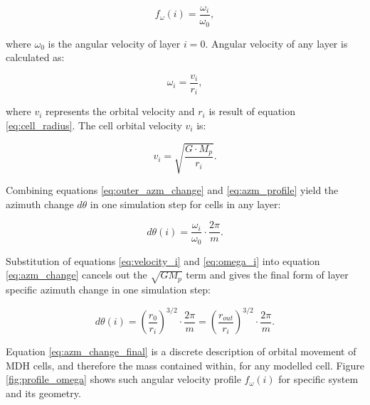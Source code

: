\begin{equation} \label{eq:azm_profile}
f_{\omega}(i) = \frac{\omega_i}{\omega_0},
\end{equation}

where $\omega_0$ is the angular velocity of layer $i=0$. Angular velocity of any layer is calculated as: 

\begin{equation} \label{eq:omega_i}
\omega_i = \frac{v_i}{r_i},
\end{equation}

where $v_i$ represents the orbital velocity and $r_i$ is result of equation \ref{eq:cell_radius}. The cell orbital velocity $v_i$ is:

\begin{equation} \label{eq:velocity_i}
v_i = \sqrt{\frac{G \cdot M_p}{r_i}}.
\end{equation}

Combining equations \ref{eq:outer_azm_change} and \ref{eq:azm_profile} yield the azimuth change $d\theta$ in one simulation step for cells in any layer:

\begin{equation} \label{eq:azm_change}
d\theta(i) = \frac{\omega_i}{\omega_0} \cdot \frac{2\pi}{m}.
\end{equation}

Substitution of equations \ref{eq:velocity_i} and \ref{eq:omega_i} into equation \ref{eq:azm_change} cancels out the $\sqrt{GM_p}$ term and gives the final form of layer specific azimuth change in one simulation step:

\begin{equation} \label{eq:azm_change_final}
d\theta(i) = \left(\frac{r_{0}}{r_i}\right)^{3/2} \cdot \frac{2\pi}{m} = \left(\frac{r_{out}}{r_i}\right)^{3/2} \cdot \frac{2\pi}{m}.
\end{equation}

Equation \ref{eq:azm_change_final} is a discrete description of orbital movement of MDH cells, and therefore the mass contained within, for any modelled cell. Figure \ref{fig:profile_omega} shows such angular velocity profile $f_{\omega}(i)$ for specific system and its geometry.

